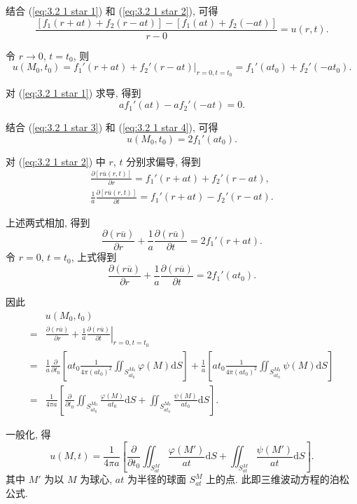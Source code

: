 结合 (\ref{eq:3.2 1 star 1}) 和 (\ref{eq:3.2 1 star 2}), 可得
\begin{equation}
    \frac{[f_1(r+at)+f_2(r-at)]-[f_1(at)+f_2(-at)]}{r-0}=u(r,t).
\end{equation}

令 $r\rightarrow 0$, $t=t_0$, 则
\begin{equation} \label{eq:3.2 1 star 3}
    u(M_0,t_0)=f_1'(r+at)+f_2'(r-at)|_{r=0,t=t_0}=f_1'(at_0)+f_2'(-at_0).
\end{equation}

对 (\ref{eq:3.2 1 star 1}) 求导, 得到
\begin{equation} \label{eq:3.2 1 star 4}
    af_1'(at)-af_2'(-at)=0.
\end{equation}

结合 (\ref{eq:3.2 1 star 3}) 和 (\ref{eq:3.2 1 star 4}), 可得
\begin{equation}
    u(M_0,t_0)=2f_1'(at_0).
\end{equation}

对 (\ref{eq:3.2 1 star 2}) 中 $r$, $t$ 分别求偏导, 得到
\begin{gather}
    \frac{\partial[r\overline{u}(r,t)]}{\partial r}=f_1'(r+at)+f_2'(r-at), \\
    \frac{1}{a}\frac{\partial[r\overline{u}(r,t)]}{\partial t}=f_1'(r+at)-f_2'(r-at).
\end{gather}

上述两式相加, 得到
\begin{equation}
    \frac{\partial(r\overline{u})}{\partial r}+\frac{1}{a}\frac{\partial(r\overline{u})}{\partial t}=2f_1'(r+at).
\end{equation}
令 $r=0$, $t=t_0$, 上式得到
\begin{equation}
    \frac{\partial(r\overline{u})}{\partial r}+\frac{1}{a}\frac{\partial(r\overline{u})}{\partial t}=2f_1'(at_0).
\end{equation}

因此
\begin{equation}
    \begin{aligned}
          & u(M_0,t_0)                                                                                                                                                                                                            \\
        = & \left.\frac{\partial(r\overline{u})}{\partial r}+\frac{1}{a}\frac{\partial(r\overline{u})}{\partial t}\right|_{r=0,t=t_0}                                                                                             \\
        = & \frac{1}{a}\frac{\partial}{\partial t_0}\left[at_0\frac{1}{4\pi(at_0)^2}\iint_{S_{at_0}^{M_0}}\varphi(M)\mathrm{d}S\right]+\frac{1}{a}\left[at_0\frac{1}{4\pi(at_0)^2}\iint_{S_{at_0}^{M_0}}\psi(M)\mathrm{d}S\right] \\
        = & \frac{1}{4\pi a}\left[\frac{\partial}{\partial t_0}\iint_{S_{at_0}^{M_0}}\frac{\varphi(M)}{at_0}\mathrm{d}S+\iint_{S_{at_0}^{M_0}}\frac{\psi(M)}{at_0}\mathrm{d}S\right].
    \end{aligned}
\end{equation}

一般化, 得
\begin{equation}
    u(M,t)=\frac{1}{4\pi a}\left[\frac{\partial}{\partial t_0}\iint_{S_{at}^M}\frac{\varphi(M')}{at}\mathrm{d}S+\iint_{S_{at}^M}\frac{\psi(M')}{at}\mathrm{d}S\right].
\end{equation}
其中 $M'$ 为以 $M$ 为球心, $at$ 为半径的球面 $S_{at}^M$ 上的点. 此即三维波动方程的泊松公式.
